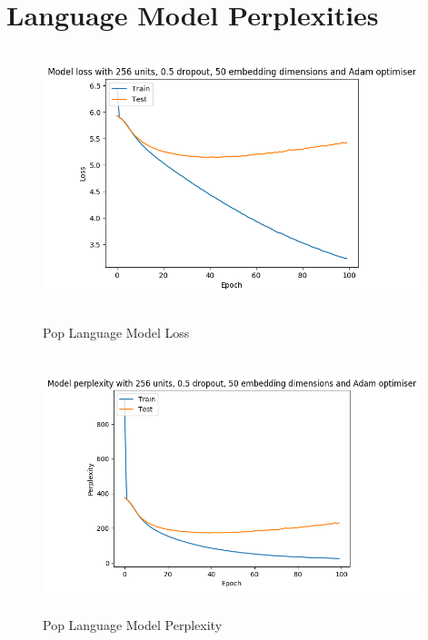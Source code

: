 \documentclass[a4paper,11pt]{report}
\begin{document}
\clearpage
{}
{}



\appendix


\chapter{Language Model Perplexities}
\label{app:code}
\begin{figure}[ht]
	\centering
	\includegraphics[width=11cm, height=7.5cm]{./figures/poploss}
	\caption{Pop Language Model Loss}
	\label{fig:poploss}
	\includegraphics[width=11cm, height=7.5cm]{./figures/popper}
	\caption{Pop Language Model Perplexity}
	\label{fig:popper}
\end{figure}
\end{document}
